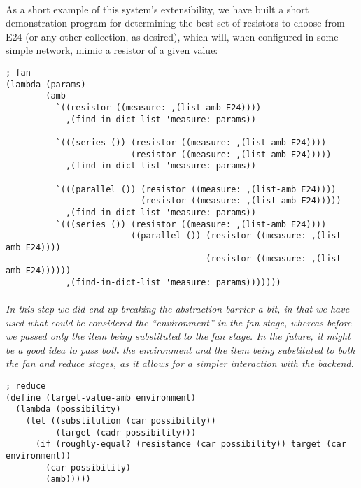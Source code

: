 \paragraph{}
As a short example of this system's extensibility, we have built a short demonstration program for determining the best set of resistors to choose from E24 (or any other collection, as desired), which will, when configured in some simple network, mimic a resistor of a given value:

\begin{verbatim}
; fan
(lambda (params)
        (amb
          `((resistor ((measure: ,(list-amb E24))))
            ,(find-in-dict-list 'measure: params))

          `(((series ()) (resistor ((measure: ,(list-amb E24))))
                         (resistor ((measure: ,(list-amb E24)))))
            ,(find-in-dict-list 'measure: params))

          `(((parallel ()) (resistor ((measure: ,(list-amb E24))))
                           (resistor ((measure: ,(list-amb E24)))))
            ,(find-in-dict-list 'measure: params))
          `(((series ()) (resistor ((measure: ,(list-amb E24))))
                         ((parallel ()) (resistor ((measure: ,(list-amb E24))))
                                        (resistor ((measure: ,(list-amb E24))))))
            ,(find-in-dict-list 'measure: params)))))))

\end{verbatim}
\paragraph{}
\textit{In this step we did end up breaking the abstraction barrier a bit, in that we have used what could be considered the ``environment'' in the fan stage, whereas before we passed only the item being substituted to the fan stage. In the future, it might be a good idea to pass both the environment and the item being substituted to both the fan and reduce stages, as it allows for a simpler interaction with the backend.}
\newpage

\begin{verbatim}
; reduce
(define (target-value-amb environment)
  (lambda (possibility)
    (let ((substitution (car possibility))
          (target (cadr possibility)))
      (if (roughly-equal? (resistance (car possibility)) target (car environment))
        (car possibility)
        (amb)))))
\end{verbatim}
